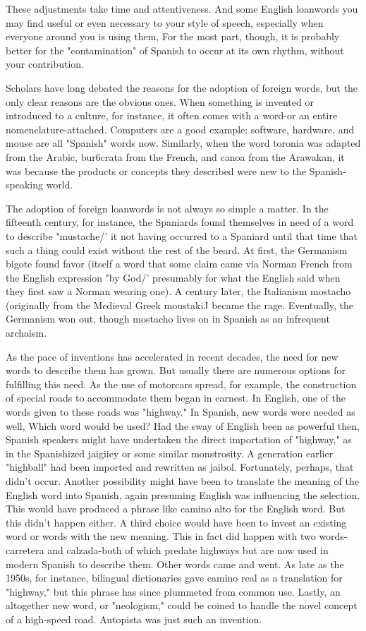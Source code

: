 These adjustments take time and attentiveness. And some English loanwords you may find useful or even necessary to your style
of speech, especially when everyone around you is using them, For
the most part, though, it is probably better for the "contamination" of
Spanish to occur at its own rhythm, without your contribution.

Scholars have long debated the reasons for the adoption of
foreign words, but the only clear reasons are the obvious ones. When
something is invented or introduced to a culture, for instance, it often
comes with a word-or an entire nomenclature-attached. Computers
are a good example: software, hardware, and mouse are all "Spanish"
words now. Similarly, when the word toronia was adapted from the
Arabic, bur6crata from the French, and canoa from the Arawakan, it
was because the products or concepts they described were new to the
Spanish-speaking world.

The adoption of foreign loanwords is not always so simple
a matter. In the fifteenth century, for instance, the Spaniards found
themselves in need of a word to describe "mustache/' it not having occurred to a Spaniard until that time that such a thing could exist without the rest of the beard. At first, the Germanism bigote found favor
(itself a word that some claim came via Norman French from the English expression "by God/' presumably for what the English said when
they first saw a Norman wearing one). A century later, the Italianism
mostacho (originally from the Medieval Greek moustakiJ became the
rage. Eventually, the Germanism won out, though mostacho lives on
in Spanish as an infrequent archaism.

As the pace of inventions has accelerated in recent decades,
the need for new words to describe them has grown. But usually there
are numerous options for fulfilling this need. As the use of motorcars
spread, for example, the construction of special roads to accommodate
them began in earnest. In English, one of the words given to these roads
was "highway." In Spanish, new words were needed as well, Which
word would be used? Had the sway of English been as powerful then,
Spanish speakers might have undertaken the direct importation of
"highway," as in the Spanishized jaigiiey or some similar monstrosity. A generation earlier "highball" had been imported and rewritten
as jaibol. Fortunately, perhaps, that didn't occur. Another possibility
might have been to translate the meaning of the English word into
Spanish, again presuming English was influencing the selection. This
would have produced a phrase like camino alto for the English word.
But this didn't happen either. A third choice would have been to invest
an existing word or words with the new meaning. This in fact did happen with two words-carretera and calzada-both of which predate
highways but are now used in modern Spanish to describe them. Other
words came and went. As late as the 1950s, for instance, bilingual
dictionaries gave camino real as a translation for "highway," but this
phrase has since plummeted from common use. Lastly, an altogether
new word, or "neologism," could be coined to handle the novel concept of a high-speed road. Autopista was just such an invention.

